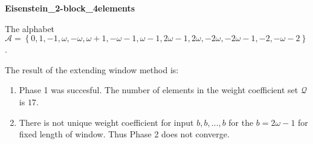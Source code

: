 \begin{exmp}
\textbf{ Eisenstein\_2-block\_4elements }

\label{ex:Eisenstein2-block4elements}

The alphabet $\mathcal{A} =\left\{0, 1, -1, \omega, -\omega, \omega + 1, -\omega - 1, \omega - 1, 2\omega - 1, 2\omega, -2\omega, -2\omega - 1, -2, -\omega - 2\right\}$.

The result of the extending window method is:
\begin{enumerate}
    \item Phase 1 was succesful.
The number of elements in the weight coefficient set $\mathcal{Q}$ is $17$.

    \item There is not unique weight coefficient for input $b,b,\dots,b$ for the $b= 2\omega - 1 $ for fixed length of window. Thus Phase 2 does not converge.

\end{enumerate}
\end{exmp}
